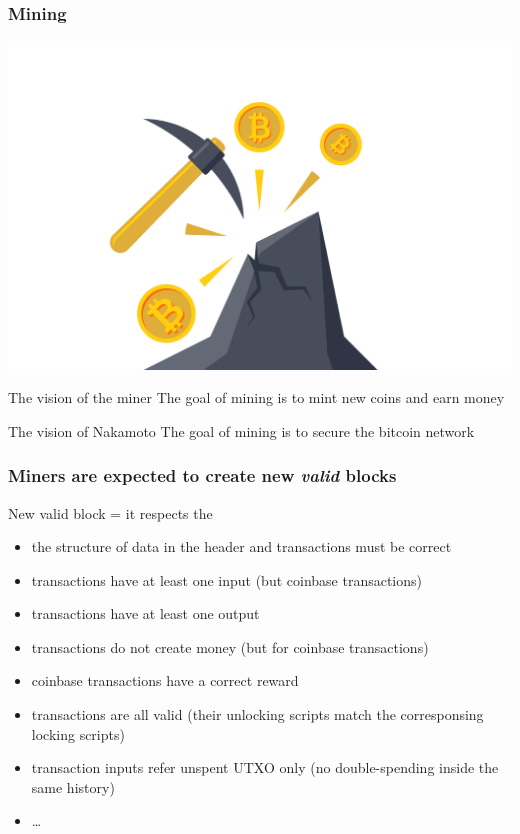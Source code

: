 \documentclass[11pt]{beamer}  %
\begin{document}
\begin{frame}\frametitle{Mining}

  \begin{center}
    \includegraphics[scale=0.1,clip=false]{pictures/mining.png}
  \end{center}

  \bigskip

  \begin{greenbox}{The vision of the miner}
    The goal of mining is to mint new coins and earn money
  \end{greenbox}

  \bigskip

  \begin{greenbox}{The vision of Nakamoto}
    The goal of mining is to secure the bitcoin network
  \end{greenbox}

\end{frame}

\begin{frame}\frametitle{Miners are expected to create new \emph{valid} blocks}

  \begin{greenbox}{New valid block = it respects the {\color{pink}{consensus rules}}}
    \begin{itemize}
    \item the structure of data in the header and transactions must be correct
    \item transactions have at least one input (but coinbase transactions)
    \item transactions have at least one output
    \item transactions do not create money (but for coinbase transactions)
    \item coinbase transactions have a correct reward
    \item transactions are all valid (their unlocking scripts match the corresponsing locking scripts)
    \item transaction inputs refer unspent UTXO only
      (\alert{no double-spending inside the same history})
    \item \ldots
    \end{itemize}
  \end{greenbox}
  
\end{frame}
\end{document}
